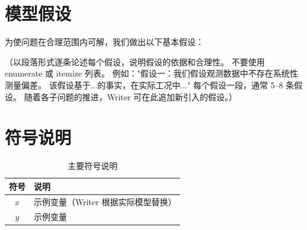 \section{模型假设}

为使问题在合理范围内可解，我们做出以下基本假设：

（以段落形式逐条论述每个假设，说明假设的依据和合理性。
不要使用 enumerate 或 itemize 列表。
例如："假设一：我们假设观测数据中不存在系统性测量偏差。
该假设基于...的事实，在实际工况中..."
每个假设一段，通常 5--8 条假设。
随着各子问题的推进，Writer 可在此追加新引入的假设。）

\section{符号说明}

\begin{table}[H]
\centering
\caption{主要符号说明}
\begin{tabular}{cl}
\toprule
\textbf{符号} & \textbf{说明} \\
\midrule
$x$ & 示例变量（Writer 根据实际模型替换） \\
$y$ & 示例变量 \\
\bottomrule
\end{tabular}
\end{table}
